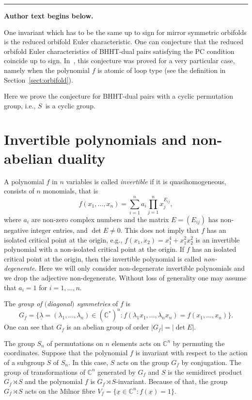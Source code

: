 \documentclass[11pt]{article}
\numberwithin{equation}{section}
\numberwithin{equation}{section}
\begin{document}
\medskip\hrule\medskip\noindent\textbf{Author text begins below.}\par
\setcounter{section}{1}
One invariant which has to be the same up to sign for mirror symmetric orbifolds is the reduced orbifold Euler characteristic. One can conjecture that the reduced orbifold Euler characteristics of BHHT-dual pairs satisfying the PC condition coincide up to sign. In~\cite{EG-1811}, this conjecture was proved for a very particular case, namely when the polynomial $f$ is atomic of loop type (see the definition in Section~\ref{sect:orbifold}).

Here we prove the conjecture for BHHT-dual pairs with a cyclic permutation group, i.e., $S$~is a cyclic group.


\section{Invertible polynomials and non-abelian duality} \label{sect:invertible_poly}
A polynomial $f$ in $n$ variables is called {\em invertible} if it is quasihomogeneous, consists of $n$ monomials, that is
\[ f(x_1, \dots , x_n)=\sum_{i=1}^n a_i \prod_{j=1}^n x_j^{E_{ij}} ,
\]
where $a_i$ are non-zero complex numbers and the matrix $E=(E_{ij})$ has non-negative integer entries, and
$\det E \neq 0$. This does not imply that $f$ has an isolated critical point at the origin, e.g., $f(x_1,x_2)=x_1^4+x_1^2x_2^2$ is an invertible polynomial with a non-isolated critical point at the origin. If $f$ has an isolated critical point at the origin, then the invertible polynomial is called {\em non-degenerate}. Here we will only consider non-degenerate invertible polynomials and we drop the adjective non-degenerate. Without loss of generality one may assume
that $a_i=1$ for $i=1, \dots , n$.

The {\em group of $($diagonal$)$ symmetries} of $f$ is
\[
G_f=\big\{\underline{\lambda}=(\lambda_1, \dots, \lambda_n)\in({\mathbb C}^*)^n\colon
f(\lambda_1x_1, \dots, \lambda_nx_n)=f(x_1, \dots, x_n)\big\} .
\]
One can see that $G_f$ is an abelian group of order $\vert G_f \vert = \vert\det E \vert$.

The group $S_n$ of permutations on $n$ elements acts on ${\mathbb C}^n$ by permuting the coordinates. Suppose that the polynomial $f$ is invariant with respect to the action of a subgroup $S$ of $S_n$. In this case, $S$ acts on the group $G_f$ by conjugation. The group of transformations of ${\mathbb C}^n$ generated by $G_f$ and $S$ is the semidirect product $G_f \rtimes S$ and the polynomial $f$ is $G_f \rtimes S$-invariant. Because of that, the group $G_f \rtimes S$ acts on the Milnor fibre $V_f=\big\{ \underline{x} \in {\mathbb C}^n \colon f(\underline{x})=1 \big\}$.
\end{document}
